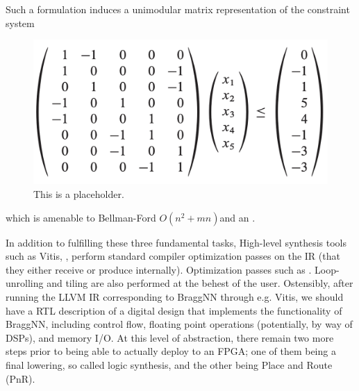 Such a formulation induces a unimodular matrix representation of the constraint system  
\begin{figure}
  \includegraphics[width=\columnwidth]{figures/unimodular.png}
  \caption{This is a placeholder.}
\end{figure}
which is amenable to Bellman-Ford $O(n^2 + mn)$and an .

In addition to fulfilling these three fundamental tasks, High-level synthesis tools such as Vitis, ,  perform standard compiler optimization passes on the IR (that they either receive or produce internally).
Optimization passes such as .
Loop-unrolling and tiling are also performed at the behest of the user.
Ostensibly, after running the LLVM IR corresponding to BraggNN through e.g. Vitis, we should have a RTL description of a digital design that implements the functionality of BraggNN, including control flow, floating point operations (potentially, by way of DSPs), and memory I/O.
At this level of abstraction, there remain two more steps prior to being able to actually deploy to an FPGA; one of them being a final lowering, so called logic synthesis, and the other being Place and Route (PnR).

